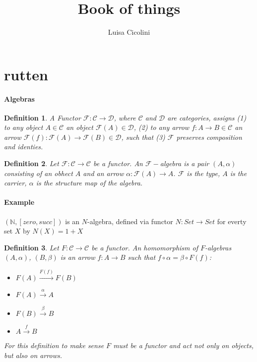 \documentclass[]{article}
\newtheorem{definition}{Definition}
\begin{document}
\title{Book of things}
\author{Luisa Cicolini}
\maketitle 

\section{rutten}

\paragraph{Algebras}

\begin{definition}
    A Functor $\mathcal{F}: \mathcal{C} \rightarrow \mathcal{D}$, where $\mathcal{C}$ and $\mathcal{D}$ are categories, 
    assigns (1) to any object $A\in \mathcal{C}$ an object $\mathcal{F}(A)\in \mathcal{D}$, (2) to any arrow $f:A\rightarrow B\in \mathcal{C}$ an 
    arrow $\mathcal{F}(f) : \mathcal{F}(A) \rightarrow \mathcal{F}(B) \in \mathcal{D}$, such that (3) $\mathcal{F}$ preserves composition and identies. 
\end{definition}

\begin{definition}
    Let $\mathcal{F}: \mathcal{C} \rightarrow \mathcal{C}$ be a functor. An $\mathcal{F}-$algebra is a pair $(A,\alpha)$ consisting of an obhect $A$ and an arrow 
    $\alpha:\mathcal{F}(A)\rightarrow A$. $\mathcal{F}$ is the type, $A$ is the carrier, $\alpha$ is the structure map of the algebra.
\end{definition}

\paragraph{Example} $(\mathbb{N}, [zero, succ])$ is an $N$-algebra, defined via functor $N:Set\rightarrow Set$ for everty set $X$ by $N(X)=1+X$

\begin{definition}
    Let $F: \mathcal{C} \rightarrow \mathcal{C}$ be a functor. 
    An homomorphism of $F$-algebras $(A,\alpha)$, $(B,\beta)$ is an arrow $f:A\rightarrow B$ such that $f\circ \alpha = \beta\circ F(f)$:
    \begin{itemize}
        \item $F(A)\xrightarrow{F(f)}F(B)$
        \item $F(A)\xrightarrow{\alpha}A$
        \item $F(B)\xrightarrow{\beta}B$
        \item $A\xrightarrow{f}B$
    \end{itemize}
    For this definition to make sense $F$ must be a functor and act not only on objects, but also on arrows.
\end{definition}
\end{document}
